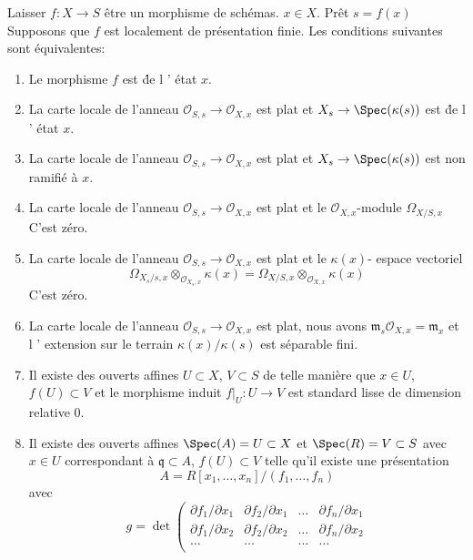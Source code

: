 \begin{lemma}

\label{lemma-etale-at-point}

Laisser $f : X \to S$ être un morphisme de schémas. $x \in X$. Prêt $s = f(x)$Supposons que $f$ est localement de présentation finie. Les conditions suivantes sont équivalentes:

\begin{enumerate}

\item Le morphisme $f$ est \'de l ' état $x$.
\item La carte locale de l'anneau $\mathcal{O}_{S, s} \to \mathcal{O}_{X, x}$
est plat et $X_s \to \Spec(\kappa(s))$ est \'de l ' état $x$.
\item La carte locale de l'anneau $\mathcal{O}_{S, s} \to \mathcal{O}_{X, x}$
est plat et $X_s \to \Spec(\kappa(s))$ est non ramifié à $x$.
\item La carte locale de l'anneau $\mathcal{O}_{S, s} \to \mathcal{O}_{X, x}$
est plat et le $\mathcal{O}_{X, x}$-module $\Omega_{X/S, x}$
C'est zéro.
\item La carte locale de l'anneau $\mathcal{O}_{S, s} \to \mathcal{O}_{X, x}$
est plat et le $\kappa(x)$- espace vectoriel
$$
\Omega_{X_s/s, x} \otimes_{\mathcal{O}_{X_s, x}} \kappa(x) =
\Omega_{X/S, x} \otimes_{\mathcal{O}_{X, x}} \kappa(x)
$$
C'est zéro.
\item La carte locale de l'anneau $\mathcal{O}_{S, s} \to \mathcal{O}_{X, x}$
est plat, nous avons $\mathfrak m_s\mathcal{O}_{X, x} = \mathfrak m_x$ et l ' extension sur le terrain $\kappa(x)/\kappa(s)$ est séparable fini.
\item Il existe des ouverts affines $U \subset X$, $V \subset S$ de telle manière que $x \in U$, $f(U) \subset V$ et le morphisme induit $f|_U : U \to V$ est standard lisse de dimension relative $0$.
\item Il existe des ouverts affines $\Spec(A) = U \subset X$
et $\Spec(R) = V \subset S$ avec $x \in U$ correspondant à $\mathfrak q \subset A$, $f(U) \subset V$
telle qu'il existe une présentation
$$
A = R[x_1, \ldots, x_n]/(f_1, \ldots, f_n)
$$
avec
$$
g =
\det
\left(
\begin{matrix}
\partial f_1/\partial x_1 &
\partial f_2/\partial x_1 &
\ldots &
\partial f_n/\partial x_1 \\
\partial f_1/\partial x_2 &
\partial f_2/\partial x_2 &
\ldots &
\partial f_n/\partial x_2 \\
\ldots & \ldots & \ldots & \ldots \\

\end{matrix}$$
\end{enumerate}
\end{lemma}
